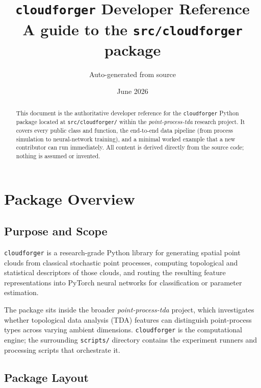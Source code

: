 \documentclass[11pt, a4paper]{article}
\title{\LARGE\bfseries\color{headercol}%
  \texttt{cloudforger} Developer Reference\\[0.4em]
  \large\normalfont\color{gray!80!black}%
  A guide to the \texttt{src/cloudforger} package
}
\author{Auto-generated from source}
\date{June 2026}
\newcommand{\code}[1]{\texttt{#1}}
\newcommand{\pyfile}[1]{\texttt{\small #1}}
\begin{document}
\maketitle
\thispagestyle{empty}

\vspace{1em}
\begin{abstract}
\noindent
This document is the authoritative developer reference for the
\code{cloudforger} Python package located at \pyfile{src/cloudforger/}
within the \emph{point-process-tda} research project.
It covers every public class and function, the end-to-end data pipeline
(from process simulation to neural-network training), and a minimal
worked example that a new contributor can run immediately.
All content is derived directly from the source code; nothing is
assumed or invented.
\end{abstract}

\newpage
\tableofcontents
\newpage

\section{Package Overview}
\label{sec:overview}

\subsection{Purpose and Scope}

\code{cloudforger} is a research-grade Python library for generating
spatial point clouds from classical stochastic point processes,
computing topological and statistical descriptors of those clouds,
and routing the resulting feature representations into PyTorch neural
networks for classification or parameter estimation.

The package sits inside the broader \emph{point-process-tda} project,
which investigates whether topological data analysis (TDA) features
can distinguish point-process types across varying ambient dimensions.
\code{cloudforger} is the computational engine; the surrounding
\pyfile{scripts/} directory contains the experiment runners and
processing scripts that orchestrate it.

\subsection{Package Layout}
\end{document}
